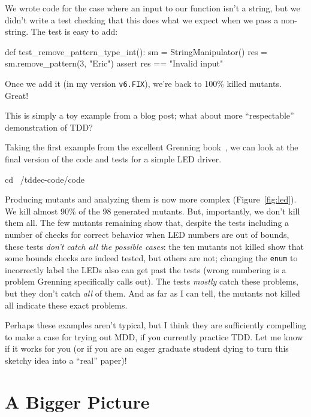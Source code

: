 \documentclass[sigplan,screen]{acmart}
\begin{document}
 We wrote code for the case where an input to our function isn't a
 string, but we didn't write a test checking that this does what we
 expect when we pass a non-string.  The test is easy to add:

 \begin{code}
def test\_remove\_pattern\_type\_int():
     sm = StringManipulator()
     res = sm.remove\_pattern(3, "Eric")
     assert res == "Invalid input"
   \end{code}

   Once we add it (in my version {\tt v6.FIX}), we're back to 100\%
   killed mutants.  Great!

   This is simply a toy example from a blog post; what about more
   ``respectable'' demonstration of TDD?

   Taking the first example from the excellent Grenning
   book~\cite{grenning}, we can look at the final version of the code
   and tests for a simple LED driver.

\begin{code}
cd ~/tddec-code/code
\end{code}

Producing mutants and analyzing them is now more complex
(Figure~\ref{fig:led}).  We kill almost 90\% of the 98 generated
mutants.  But, importantly, we don't kill them all.  The few mutants
remaining show that, despite the tests including a number of checks
for correct behavior when LED numbers are out of bounds, these tests
\emph{don't catch all the possible cases}:  the ten mutants not killed
show that some bounds checks are indeed tested, but others are not;
changing the {\tt enum} to incorrectly label the LEDs also can get
past the tests (wrong numbering is a problem Grenning specifically
calls out).  The tests \emph{mostly} catch these problems, but they
don't catch \emph{all} of them.  And as far as I can tell, the mutants
not killed all indicate these exact problems.

Perhaps these examples aren't typical, but I think they are
sufficiently compelling to make a case for trying out MDD, if you
currently practice TDD.  Let me know if it works for you (or if you
are an eager graduate student dying to turn this sketchy idea into a ``real'' paper)!


\section{A Bigger Picture}
\end{document}
